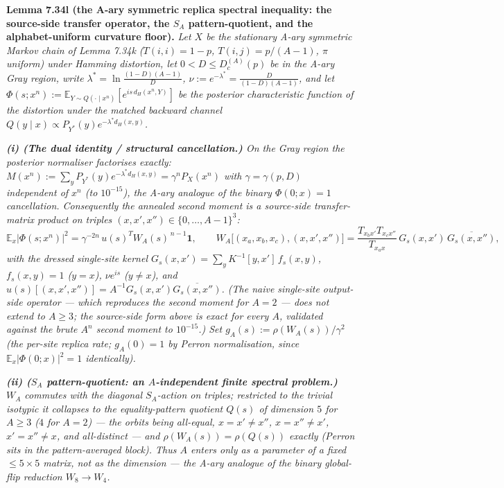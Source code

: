 \documentclass[
]{article}
\begin{document}
\textbf{Lemma 7.34l (the A-ary symmetric replica spectral inequality: the
source-side transfer operator, the $S_A$ pattern-quotient, and the
alphabet-uniform curvature floor).} \emph{Let $X$ be the stationary A-ary
symmetric Markov chain of Lemma 7.34k ($T(i,i)=1-p$, $T(i,j)=p/(A-1)$, $\pi$
uniform) under Hamming distortion, let $0<D\le D_c^{(A)}(p)$ be in the A-ary
Gray region, write $\lambda^*=\ln\tfrac{(1-D)(A-1)}{D}$, $\nu:=e^{-\lambda^*}
=\tfrac{D}{(1-D)(A-1)}$, and let $\Phi(s;x^n):=\mathbb E_{Y\sim Q(\cdot\mid
x^n)}[e^{is\,d_H(x^n,Y)}]$ be the posterior characteristic function of the
distortion under the matched backward channel $Q(y\mid x)\propto
P_{Y^*}(y)e^{-\lambda^* d_H(x,y)}$.}

\emph{\textbf{(i) (The dual identity / structural cancellation.)} On the Gray
region the posterior normaliser factorises exactly:
$M(x^n):=\sum_y P_{Y^*}(y)e^{-\lambda^* d_H(x,y)}=\gamma^n P_X(x^n)$ with
$\gamma=\gamma(p,D)$ \emph{independent of $x^n$} (to $10^{-15}$), the A-ary
analogue of the binary $\Phi(0;x)=1$ cancellation. Consequently the annealed
second moment is a \emph{source-side} transfer-matrix product on triples
$(x,x',x'')\in\{0,\dots,A-1\}^3$:}
\[
  \mathbb E_x\big|\Phi(s;x^n)\big|^2=\gamma^{-2n}\,u(s)^{T}W_A(s)^{\,n-1}\mathbf 1,
\qquad
  W_A\big[(x_a,x_b,x_c),(x,x',x'')\big]=\frac{T_{x_bx'}T_{x_cx''}}{T_{x_ax}}\,
  G_s(x,x')\,\overline{G_s(x,x'')},
\]
\emph{with the dressed single-site kernel $G_s(x,x')=\sum_y K^{-1}[y,x']\,
f_s(x,y)$, $f_s(x,y)=1$ ($y=x$), $\nu e^{is}$ ($y\ne x$), and
$u(s)[(x,x',x'')]=A^{-1}G_s(x,x')\overline{G_s(x,x'')}$. \emph{(The naive
single-site \emph{output}-side operator --- which reproduces the second moment
for $A=2$ --- does not extend to $A\ge3$; the source-side form above is exact for
every $A$, validated against the brute $A^n$ second moment to $10^{-15}$.)} Set
$g_A(s):=\rho(W_A(s))/\gamma^2$ (the per-site replica rate; $g_A(0)=1$ by
Perron normalisation, since $\mathbb E_x|\Phi(0;x)|^2=1$ identically).}

\emph{\textbf{(ii) ($S_A$ pattern-quotient: an $A$-independent finite spectral
problem.)} $W_A$ commutes with the diagonal $S_A$-action on triples;
restricted to the trivial isotypic it collapses to the \emph{equality-pattern
quotient} $Q(s)$ of dimension $5$ for $A\ge3$ ($4$ for $A=2$) --- the orbits
being all-equal, $x{=}x'{\ne}x''$, $x{=}x''{\ne}x'$, $x'{=}x''{\ne}x$, and
all-distinct --- and $\rho(W_A(s))=\rho(Q(s))$ exactly (Perron sits in the
pattern-averaged block). Thus $A$ enters only as a \emph{parameter} of a fixed
$\le5\times5$ matrix, not as the dimension --- the A-ary analogue of the
binary global-flip reduction $W_8\to W_4$.}
\end{document}
